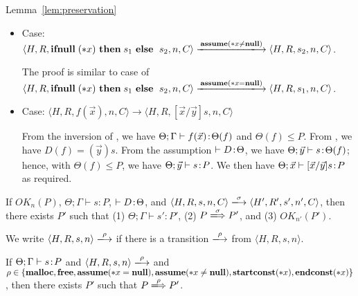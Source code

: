 \begin{pfof}{Lemma~\ref{lem:preservation}}
\begin{itemize}
  We need to find $P'$ such that \(\Theta; \Gamma \vdash s_1\COL P'\)
  , \(P \xLongrightarrow{\sassx} P'\) and \(\OK_n(P'\)).  Take \(P''\) as
  \(P'\).  Then, \(\OK_n(P')\) and \(P \xLongrightarrow{\sassx} P'\)
  hold. We also have \(\Theta; \Gamma' \vdash s_{1}\COL P'\) from
  \(\Theta; \Gamma \vdash s_{1}\COL P_1\), \(P_{1} \le P'' \) and
  .

\item Case: \(\langle H, R, \IFNULL \Sirx \ \THEN s_{1} \ \ELSE \ s_{2},
  n , C \rangle \xlongrightarrow{\sassxn} \langle H, R, s_{2}, n, C\rangle\).

 The proof is similar to case of  \(\langle H, R, \IFNULL \Sirx \ \THEN s_{1} \ \ELSE
  \ s_{2}, n, C \rangle \xlongrightarrow{\sassx} \langle H, R, s_{1}, n, C\rangle\).

\item Case: \( \langle H, R, f(\vec{x}) , n, C \rangle \rightarrow  \langle H, R, [\vec{x}/\vec{y}]s, n, C \rangle \)


From the inversion of , we have \(\Theta; \Gamma \vdash
f(\vec{x}) \!:\! \Theta(f)\) and \(\Theta(f) \le P\).  From
, we have \(D(f) = (\vec{y})s\).  From the assumption
\(\vdash D \!:\! \Theta\), we have \(\Theta; \vec{y} \vdash s \!:\!
\Theta(f)\); hence, with \(\Theta(f) \le P\), we have \(\Theta;
\vec{y} \vdash s \!:\! P\).  We then have \(\Theta; \vec{x} \vdash
    [\vec{x}/\vec{y}]s \!:\! P\) as required.

\end{itemize}
\end{pfof}  

\begin{corollary}
\label{cor:preservation}
If $OK_{n}(P)$, $\Theta; \Gamma \vdash s : P$, \(\vdash D \!:\!
\Theta\), and $\langle H,R,s,n,C\rangle \xlongrightarrow{\sigma}
\langle H',R',s', n', C \rangle$, then there exists $P'$ such that (1) $
\Theta; \Gamma \vdash s' : P'$, (2) \(P \xLongrightarrow{\sigma} P'\),
and (3) \(OK_{n'}(P')\).
\end{corollary}

We write \(\langle H, R, s, n \rangle \xlongrightarrow{\rho}\) if
there is a transition \(\xlongrightarrow{\rho}\) from \(\langle H, R,
s, n \rangle\).

\begin{lemma}
\label{lem:enabled}
If \(\Theta; \Gamma \vdash s \!:\! P\) and \(\langle H, R, s, n \rangle
\xlongrightarrow{\rho}\) and \(\rho \in \{\mathbf{malloc}, \mathbf{free}, \mathbf{assume}(*x = \mathbf{null}), \mathbf{assume}(*x \ne \mathbf{null}), \mathbf{startconst}(*x), \mathbf{endconst}(*x)\}\), then
there exists \(P'\) such that \(P \xLongrightarrow{\rho} P'\).
\end{lemma}

